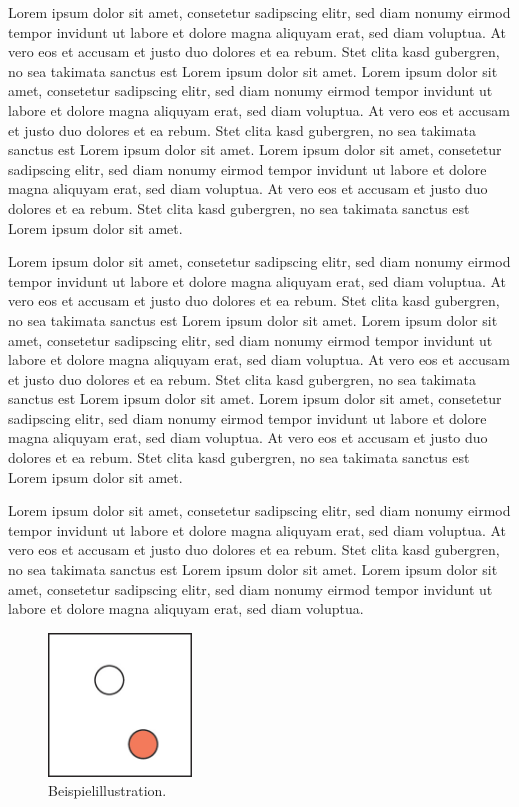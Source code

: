 \documentclass[journal]{vgtc}
\begin{document}
Lorem ipsum dolor sit amet, consetetur sadipscing elitr, sed diam
nonumy eirmod tempor invidunt ut labore et dolore magna aliquyam erat,
sed diam voluptua. At vero eos et accusam et justo duo dolores et ea
rebum. Stet clita kasd gubergren, no sea takimata sanctus est Lorem
ipsum dolor sit amet. Lorem ipsum dolor sit amet, consetetur
sadipscing elitr, sed diam nonumy eirmod tempor invidunt ut labore et
dolore magna aliquyam erat, sed diam voluptua. At vero eos et accusam
et justo duo dolores et ea rebum. Stet clita kasd gubergren, no sea
takimata sanctus est Lorem ipsum dolor sit amet. Lorem ipsum dolor sit
amet, consetetur sadipscing elitr, sed diam nonumy eirmod tempor
invidunt ut labore et dolore magna aliquyam erat, sed diam
voluptua. At vero eos et accusam et justo duo dolores et ea
rebum. Stet clita kasd gubergren, no sea takimata sanctus est Lorem
ipsum dolor sit amet.

Lorem ipsum dolor sit amet, consetetur sadipscing elitr, sed diam
nonumy eirmod tempor invidunt ut labore et dolore magna aliquyam erat,
sed diam voluptua. At vero eos et accusam et justo duo dolores et ea
rebum. Stet clita kasd gubergren, no sea takimata sanctus est Lorem
ipsum dolor sit amet. Lorem ipsum dolor sit amet, consetetur
sadipscing elitr, sed diam nonumy eirmod tempor invidunt ut labore et
dolore magna aliquyam erat, sed diam voluptua. At vero eos et accusam
et justo duo dolores et ea rebum. Stet clita kasd gubergren, no sea
takimata sanctus est Lorem ipsum dolor sit amet. Lorem ipsum dolor sit
amet, consetetur sadipscing elitr, sed diam nonumy eirmod tempor
invidunt ut labore et dolore magna aliquyam erat, sed diam
voluptua. At vero eos et accusam et justo duo dolores et ea
rebum. Stet clita kasd gubergren, no sea takimata sanctus est Lorem
ipsum dolor sit amet.

Lorem ipsum dolor sit amet, consetetur sadipscing elitr, sed diam
nonumy eirmod tempor invidunt ut labore et dolore magna aliquyam erat,
sed diam voluptua. At vero eos et accusam et justo duo dolores et ea
rebum. Stet clita kasd gubergren, no sea takimata sanctus est Lorem
ipsum dolor sit amet. Lorem ipsum dolor sit amet, consetetur
sadipscing elitr, sed diam nonumy eirmod tempor invidunt ut labore et
dolore magna aliquyam erat, sed diam voluptua.


\begin{figure}[tb]
  \centering
  \includegraphics[width=1.5in]{sample}
  \caption{\label{fig:sample} Beispielillustration.}
\end{figure}
\end{document}
